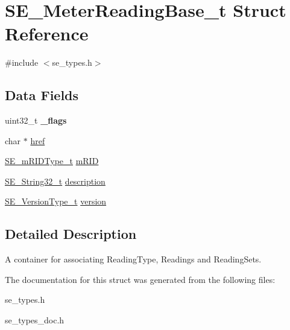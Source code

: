 \hypertarget{structSE__MeterReadingBase__t}{}\section{S\+E\+\_\+\+Meter\+Reading\+Base\+\_\+t Struct Reference}
\label{structSE__MeterReadingBase__t}


{\ttfamily \#include $<$se\+\_\+types.\+h$>$}

\subsection*{Data Fields}
\begin{DoxyCompactItemize}
\item 
uint32\+\_\+t {\bfseries \+\_\+flags}
\item 
char $\ast$ \hyperlink{group__MeterReadingBase_ga9f76ab492ecd22bec26e715a88738b88}{href}
\item 
\hyperlink{group__mRIDType_gac74622112f3a388a2851b2289963ba5e}{S\+E\+\_\+m\+R\+I\+D\+Type\+\_\+t} \hyperlink{group__MeterReadingBase_gae4ef9b5a1be0798622ffcbc81eab7647}{m\+R\+ID}
\item 
\hyperlink{group__String32_gac9f59b06b168b4d2e0d45ed41699af42}{S\+E\+\_\+\+String32\+\_\+t} \hyperlink{group__MeterReadingBase_ga9d6cd403c20c11642dd443f5a0052282}{description}
\item 
\hyperlink{group__VersionType_ga4b8d27838226948397ed99f67d46e2ae}{S\+E\+\_\+\+Version\+Type\+\_\+t} \hyperlink{group__MeterReadingBase_ga094a26177e2ad97f8e2d4d606df742fc}{version}
\end{DoxyCompactItemize}


\subsection{Detailed Description}
A container for associating Reading\+Type, Readings and Reading\+Sets. 

The documentation for this struct was generated from the following files\+:\begin{DoxyCompactItemize}
\item 
se\+\_\+types.\+h\item 
se\+\_\+types\+\_\+doc.\+h\end{DoxyCompactItemize}
